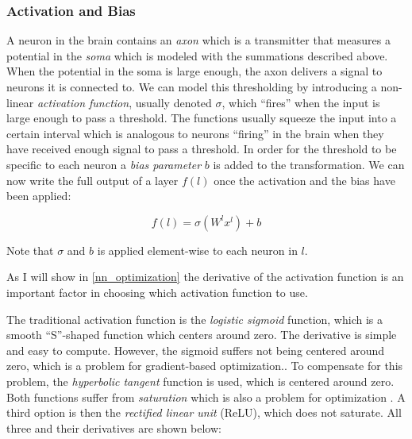\subsubsection{Activation and Bias}

A neuron in the brain contains an \emph{axon} which is a transmitter that measures a potential in the \emph{soma} which is modeled with the summations described above. When the potential in the soma is large enough, the axon delivers a signal to neurons it is connected to. We can model this thresholding by introducing a non-linear \emph{activation function}, usually denoted $\sigma$, which ``fires'' when the input is large enough to pass a threshold. The functions usually squeeze the input into a certain interval which is analogous to neurons ``firing'' in the brain when they have received enough signal to pass a threshold. In order for the threshold to be specific to each neuron a \emph{bias parameter} $b$ is added to the transformation. We can now write the full output of a layer $f(l)$ once the activation and the bias have been applied:

$$
    f(l) = \sigma(W^lx^l) + b
$$   

Note that $\sigma$ and $b$ is applied element-wise to each neuron in $l$.

As I will show in \autoref{nn_optimization} the derivative of the activation function is an important factor in choosing which activation function to use.

The traditional activation function is the \emph{logistic sigmoid} function, which is a smooth ``S''-shaped function which centers around zero. The derivative is simple and easy to compute. However, the sigmoid suffers not being centered around zero, which is a problem for gradient-based optimization.\citep[p. 66]{dlbook}. To compensate for this problem, the \emph{hyperbolic tangent} function is used, which is centered around zero. Both functions suffer from \emph{saturation} which is also a problem for optimization \cite{activations}. A third option is then the \emph{rectified linear unit} (ReLU), which does not saturate. All three and their derivatives are shown below:

\begin{center}
\end{center}




